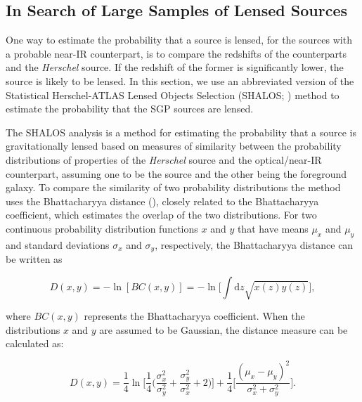 \documentclass[fleqn,usenatbib]{mnras}
\newcommand{\dd}[1]{\mathrm{d}#1}
\begin{document}
\subsection{In Search of Large Samples of Lensed Sources}
\label{sec:shalos_methodology}

One way to estimate the probability that a source is lensed, for the sources with a probable near-IR counterpart, is to compare the redshifts of the counterparts and the \textit{Herschel} source. If the redshift of the former is significantly lower, the source is likely to be lensed. In this section, we use an abbreviated version of the Statistical Herschel-ATLAS Lensed Objects Selection (SHALOS; \citealt{GonzalezNuevo_2019}) method to estimate the probability that the SGP sources are lensed.

The SHALOS analysis is a method for estimating the probability that a source is gravitationally lensed based on measures of similarity between the probability distributions of properties of the \textit{Herschel} source and the optical/near-IR counterpart, assuming one to be the source and the other being the foreground galaxy. To compare the similarity of two  probability distributions the method uses the Bhattacharyya distance (\citealt{Bhattacharyya_1943}), closely related to the Bhattacharyya coefficient, which estimates the overlap of the two distributions. For two continuous probability distribution functions $x$ and $y$ that have means $\mu_x$ and $\mu_y$ and standard deviations $\sigma_x$ and $\sigma_y$, respectively, the Bhattacharyya distance can be written as

\begin{equation}
\label{eq:bhattacharyya_distance}
D(x,y) = -\ln[BC(x,y)] = -\ln\Bigg[\int\dd{z}\sqrt{x(z)y(z)}\Bigg],
\end{equation}

\noindent where $BC(x, y)$ represents the Bhattacharyya coefficient. When the distributions $x$ and $y$ are assumed to be Gaussian, the distance measure can be calculated as:

\begin{equation}
\label{eq:bhattacharyya_distance_normal}
D(x, y) = \frac{1}{4}\ln\Bigg[\frac{1}{4}\Bigg(\frac{\sigma_x^2}{\sigma_y^2} + \frac{\sigma_y^2}{\sigma_x^2} + 2\Bigg)\Bigg] + \frac{1}{4}\Bigg[\frac{(\mu_x - \mu_y)^2}{\sigma_x^2 + \sigma_y^2}\Bigg]. 
\end{equation}
\end{document}
